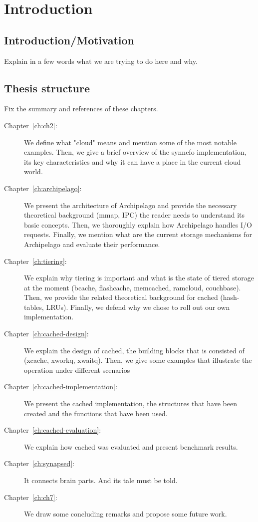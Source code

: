 \chapter{Introduction}\label{ch:intro}

\section{Introduction/Motivation}

\todo Explain in a few words what we are trying to do here and why.

\section{Thesis structure}

\fixme Fix the summary and references of these chapters.

\begin{description}
\item[Chapter~\ref{ch:ch2}:]
We define what "cloud" means and mention some of the most notable examples.
Then, we give a brief overview of the synnefo implementation, its key
characteristics and why it can have a place in the current cloud world.
\item[Chapter~\ref{ch:archipelago}:]
We present the architecture of Archipelago and provide the necessary 
theoretical background (mmap, IPC) the reader needs to understand its basic 
concepts. Then, we thoroughly explain how Archipelago handles I/O requests.  
Finally, we mention what are the current storage mechanisms for Archipelago and 
evaluate their performance.
\item[Chapter~\ref{ch:tiering}:]
We explain why tiering is important and what is the state of tiered storage at
the moment (bcache, flashcache, memcached, ramcloud, couchbase).  Then, we
provide the related theoretical background for cached (hash-tables, LRUs).
Finally, we defend why we chose to roll out our own implementation.
\item[Chapter~\ref{ch:cached-design}:]
We explain the design of cached, the building blocks that is consisted of
(xcache, xworkq, xwaitq). Then, we give some examples that illustrate the 
operation under different scenarios
\item[Chapter~\ref{ch:cached-implementation}:]
We present the cached implementation, the structures that have been created and 
the functions that have been used.
\item[Chapter~\ref{ch:cached-evaluation}:]
We explain how cached was evaluated and present benchmark results.
\item[Chapter~\ref{ch:synapsed}:]
It connects brain parts. And its tale must be told.
\item[Chapter~\ref{ch:ch7}:]
We draw some concluding remarks and propose some future work.
\end{description}
